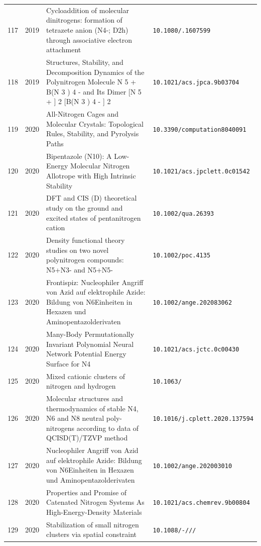 {\begin{longtable}{@{}cp{1.0cm}p{8.4cm}p{4.2cm}@{}}
117 & 2019 & Cycloaddition of molecular dinitrogens: formation of tetrazete anion (N4-; D2h) through associative electron attachment & \texttt{10.1080/\allowbreak 00268976.2019.1607599} \\
118 & 2019 & Structures, Stability, and Decomposition Dynamics of the Polynitrogen Molecule N 5 + B(N 3 ) 4 - and Its Dimer [N 5 + ] 2 [B(N 3 ) 4 - ] 2 & \texttt{10.1021/\allowbreak acs.jpca.9b03704} \\
119 & 2020 & All-Nitrogen Cages and Molecular Crystals: Topological Rules, Stability, and Pyrolysis Paths & \texttt{10.3390/\allowbreak computation8040091} \\
120 & 2020 & Bipentazole (N10): A Low-Energy Molecular Nitrogen Allotrope with High Intrinsic Stability & \texttt{10.1021/\allowbreak acs.jpclett.0c01542} \\
121 & 2020 & DFT and CIS (D) theoretical study on the ground and excited states of pentanitrogen cation & \texttt{10.1002/\allowbreak qua.26393} \\
122 & 2020 & Density functional theory studies on two novel polynitrogen compounds: N5+N3- and N5+N5- & \texttt{10.1002/\allowbreak poc.4135} \\
123 & 2020 & Frontispiz: Nucleophiler Angriff von Azid auf elektrophile Azide: Bildung von N6Einheiten in Hexazen und Aminopentazolderivaten & \texttt{10.1002/\allowbreak ange.202083062} \\
124 & 2020 & Many-Body Permutationally Invariant Polynomial Neural Network Potential Energy Surface for N4 & \texttt{10.1021/\allowbreak acs.jctc.0c00430} \\
125 & 2020 & Mixed cationic clusters of nitrogen and hydrogen & \texttt{10.1063/\allowbreak 1.5140850} \\
126 & 2020 & Molecular structures and thermodynamics of stable N4, N6 and N8 neutral poly-nitrogens according to data of QCISD(T)/TZVP method & \texttt{10.1016/\allowbreak j.cplett.2020.137594} \\
127 & 2020 & Nucleophiler Angriff von Azid auf elektrophile Azide: Bildung von N6Einheiten in Hexazen und Aminopentazolderivaten & \texttt{10.1002/\allowbreak ange.202003010} \\
128 & 2020 & Properties and Promise of Catenated Nitrogen Systems As High-Energy-Density Materials & \texttt{10.1021/\allowbreak acs.chemrev.9b00804} \\
129 & 2020 & Stabilization of small nitrogen clusters via spatial constraint & \texttt{10.1088/\allowbreak 1742-\allowbreak 6596/\allowbreak 1435/\allowbreak 1/\allowbreak 012062} \\

\end{longtable}}
